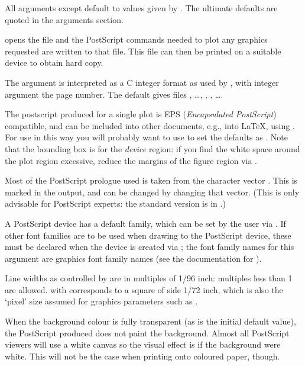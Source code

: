 %
\begin{Details}\relax
All arguments except  default to values given by
.  The ultimate defaults are quoted in the
arguments section.

 opens the file  and the PostScript
commands needed to plot any graphics requested are written to that
file.  This file can then be printed on a suitable device to obtain
hard copy.

The  argument is interpreted as a C integer format as used
by , with integer argument the page number.
The default gives files , \dots, ,
, \dots.

The postscript produced for a single \R{} plot is EPS (\emph{Encapsulated
PostScript}) compatible, and can be included into other documents,
e.g., into LaTeX, using .  For use
in this way you will probably want to use  to
set the defaults as .  Note that the bounding box is for the \emph{device}
region: if you find the white space around the plot region excessive,
reduce the margins of the figure region via .

Most of the PostScript prologue used is taken from the \R{} character
vector .  This is marked in the output, and can be
changed by changing that vector.  (This is only advisable for
PostScript experts: the standard version is in
.)

A PostScript device has a default family, which can be set by the user
via .  If other font families are to be used when drawing
to the PostScript device, these must be declared when the device is
created via ;  the font family names for this argument are
\R{} graphics font family names (see the documentation for
).

Line widths as controlled by  are in multiples of
1/96 inch: multiples less than 1 are allowed.   with
 corresponds to a square of side 1/72 inch, which is
also the `pixel' size assumed for graphics parameters such as
.

When the background colour is fully transparent (as is the initial
default value), the PostScript produced does not paint the
background. Almost all PostScript viewers will use a white canvas so
the visual effect is if the background were white.  This will not be
the case when printing onto coloured paper, though.
\end{Details}
